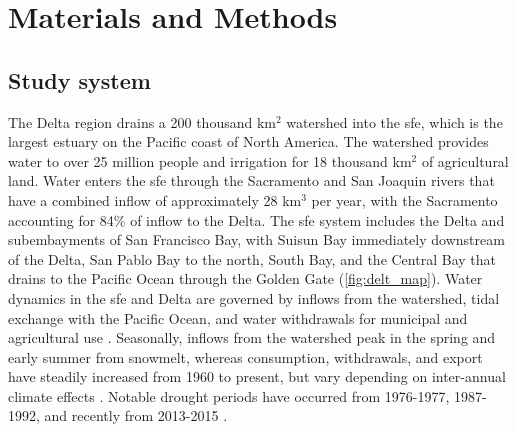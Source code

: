 \documentclass[journal = esthag, manuscript = article]{achemso}\usepackage[]{graphicx}\usepackage[]{color}
\begin{document}
\section{Materials and Methods}

\subsection{Study system}

The Delta region drains a 200 thousand km$^2$ watershed into the \ac{sfe}, which is the largest estuary on the Pacific coast of North America.  The watershed provides water to over 25 million people and irrigation for 18 thousand km$^2$ of agricultural land.  Water enters the \ac{sfe} through the Sacramento and San Joaquin rivers that have a combined inflow of approximately 28 km$^3$ per year, with the Sacramento accounting for 84\% of inflow to the Delta.  The \ac{sfe} system includes the Delta and subembayments of San Francisco Bay, with Suisun Bay immediately downstream of the Delta, San Pablo Bay to the north, South Bay, and the Central Bay that drains to the Pacific Ocean through the Golden Gate (\cref{fig:delt_map}).  Water dynamics in the \ac{sfe} and Delta are governed by inflows from the watershed, tidal exchange with the Pacific Ocean, and water withdrawals for municipal and agricultural use \cite{Jassby00}.  Seasonally, inflows from the watershed peak in the spring and early summer from snowmelt, whereas consumption, withdrawals, and export have steadily increased from 1960 to present, but vary depending on inter-annual climate effects \cite{Cloern12b}. Notable drought periods have occurred from 1976-1977, 1987-1992, and recently from 2013-2015 \cite{Cloern15}.
\end{document}
